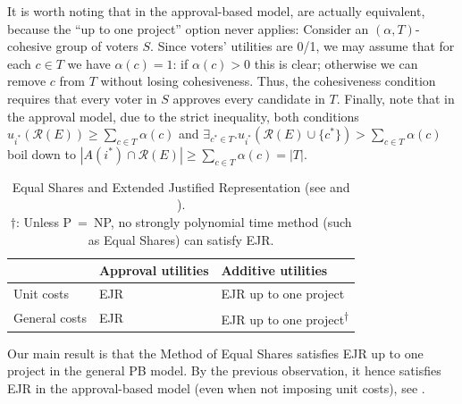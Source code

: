 \documentclass[10pt]{scrartcl}
\renewcommand*{\geq}{\geqslant}
\newcommand{\calR}{{{\mathcal{R}}}}
\theoremstyle{definition}
\theoremstyle{plain}
\begin{document}
It is worth noting that in the approval-based model,  are actually equivalent, because the ``up to one project'' option never applies: Consider an $(\alpha, T)$-cohesive group of voters $S$. Since voters' utilities are 0/1, we may assume that for each $c\in T$ we have $\alpha(c) = 1$: if $\alpha(c)>0$ this is clear; otherwise we can remove $c$ from $T$ without losing cohesiveness. Thus, the cohesiveness condition requires that every voter in $S$ approves every candidate in $T$. Finally, note that in the approval model, due to the strict inequality, both conditions $u_{i^*}(\calR(E)) \geq \sum_{c \in T}\alpha(c)$ and $\exists_{c^* \in T}. u_{i^*}(\calR(E)\cup \{c^*\}) > \sum_{c \in T}\alpha(c)$ boil down to $|A(i^*) \cap \calR(E)| \geq \sum_{c \in T}\alpha(c) = |T|$.

\begin{table}
	\centering
	\begin{tabular}{lll}
		\toprule
		& Approval utilities & Additive utilities \\
		\midrule 
		Unit costs & EJR & EJR up to one project \\
		\midrule
		General costs & EJR & EJR up to one project\textsuperscript{$\dagger$} \\
		\bottomrule
	\end{tabular}
	\caption{Equal Shares and Extended Justified Representation (see  and ). \\ $\dagger$: Unless P~=~NP, no strongly polynomial time method (such as Equal Shares) can satisfy EJR.}
	\label{tbl:equal-shares-ejr}
\end{table}

Our main result is that the Method of Equal Shares satisfies EJR up to one project in the general PB model. By the previous observation, it hence satisfies EJR in the approval-based model (even when not imposing unit costs), see .
\end{document}
